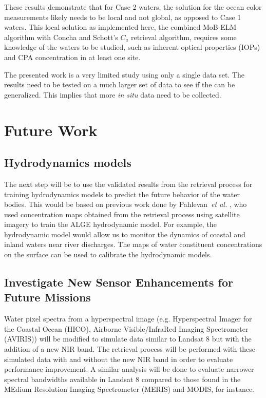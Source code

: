 These results demonstrate that for Case 2 waters, the solution for the ocean color measurements likely needs to be local and not global, as opposed to Case 1 waters. This local solution as implemented here, the combined MoB-ELM algorithm with Concha and Schott's $C_a$ retrieval algorithm, requires some knowledge of the waters to be studied, such as inherent optical properties (IOPs) and CPA concentration in at least one site.

The presented work is a very limited study using only a single data set. The results need to be tested on a much larger set of data to see if the can be generalized. This implies that more {\it in situ} data need to be collected.
\section{Future Work}
\subsection{Hydrodynamics models} 
The next step will be to use the validated results from the retrieval process for training hydrodynamics models to predict the future behavior of the water bodies. This would be based on previous work done by Pahlevan~{\it et al.} \cite{Pahlevan:2012b}, who used concentration maps obtained from the retrieval process using satellite imagery to train the ALGE hydrodynamic model. For example, the hydrodynamic model would allow us to monitor the dynamics of coastal and inland waters near river discharges. The maps of water constituent concentrations on the surface can be used to calibrate the hydrodynamic models.

\subsection{Investigate New Sensor Enhancements for Future Missions}
Water pixel spectra from a hyperspectral image (e.g. Hyperspectral Imager for the Coastal Ocean (HICO),  Airborne Visible/InfraRed Imaging Spectrometer (AVIRIS)) will be modified to simulate data similar to Landsat 8 but with the addition of a new NIR band. The retrieval process will be performed with these simulated data with and without the new NIR band in order to evaluate performance improvement. A similar analysis will be done to evaluate narrower spectral bandwidths available in Landsat 8 compared to those found in the MEdium Resolution Imaging Spectrometer (MERIS) and MODIS, for instance. 

